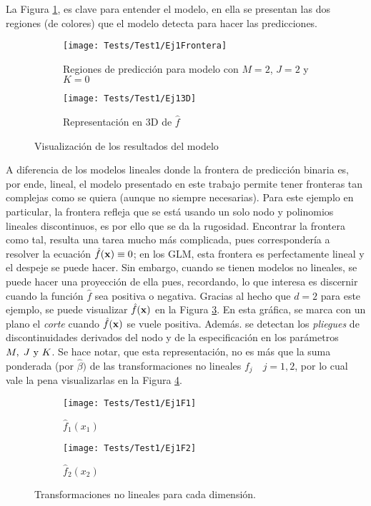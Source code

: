 \documentclass[../Main/Main.tex]{subfiles}
\begin{document}
La Figura \ref{fig:Test1Ej1}, es clave para entender el modelo, en ella se presentan las dos regiones (de colores) que el modelo detecta para hacer las predicciones.
\begin{figure}[h]
	\centering
	\begin{subfigure}[b]{0.45\textwidth}
    	\texttt{[image: Tests/Test1/Ej1Frontera]}
		\caption{Regiones de predicción para modelo con $M = 2$, $J = 2$ y $K = 0$}
	\label{fig:Test1Ej1}
	\end{subfigure}
	\hfill    
    \begin{subfigure}[b]{0.45\textwidth}
        \texttt{[image: Tests/Test1/Ej13D]}
        \caption{Representación en 3D de $\hat{f}$}
        \label{fig:Test1Ej13D}
    \end{subfigure}
    \caption{Visualización de los resultados del modelo}
\end{figure}
A diferencia de los modelos lineales donde la frontera de predicción binaria es, por ende, lineal, el modelo presentado en este trabajo permite tener fronteras tan complejas como se quiera (aunque no siempre necesarias). Para este ejemplo en particular, la frontera refleja que se está usando un solo nodo y polinomios lineales discontinuos, es por ello que se da la rugosidad. Encontrar la frontera como tal, resulta una tarea mucho más complicada, pues correspondería a resolver la ecuación  $\hat{f}(\mathbf{x}) \equiv 0$; en los GLM, esta frontera es perfectamente lineal y el despeje se puede hacer. Sin embargo, cuando se tienen modelos no lineales, se puede hacer una proyección de ella pues, recordando, lo que interesa es discernir cuando la función $\hat{f}$ sea positiva o negativa. Gracias al hecho que $d = 2$ para este ejemplo, se puede visualizar $\hat{f}(\mathbf{x})$ en la Figura \ref{fig:Test1Ej13D}. En esta gráfica, se marca con un plano el \textit{corte} cuando $\hat{f}(\mathbf{x})$ se vuele positiva. Además. se detectan los \textit{pliegues} de discontinuidades derivados del nodo y de la especificación en los parámetros $M,\;J\text{ y }K$. Se hace notar, que esta representación, no es más que la suma ponderada (por $\hat{\beta})$ de las transformaciones no lineales $f_j \quad j=1,2$, por lo cual vale la pena visualizarlas en la Figura \ref{fig:Test1Ej1Fs}. \\
\begin{figure}[h]
    \begin{subfigure}[b]{0.45\textwidth}
        \texttt{[image: Tests/Test1/Ej1F1]}
        \caption{$\hat{f}_1(x_1)$}
    \end{subfigure}
	\hfill
	    \begin{subfigure}[b]{0.45\textwidth}
        \texttt{[image: Tests/Test1/Ej1F2]}
        \caption{$\hat{f}_2(x_2)$}
    \end{subfigure}
    \caption{Transformaciones no lineales para cada dimensión.}\label{fig:Test1Ej1Fs}
\end{figure}
\end{document}
